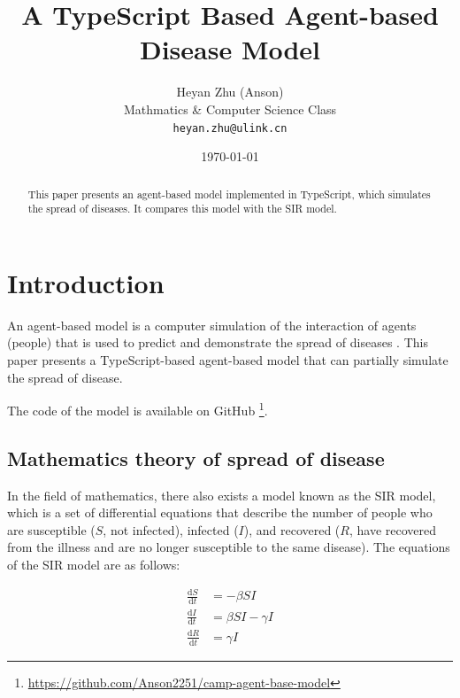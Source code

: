 \documentclass[12pt]{article}
\title{A TypeScript Based Agent-based Disease Model}
\author{Heyan Zhu (Anson)\\
\footnotesize Mathmatics \& Computer Science Class\\
\footnotesize \texttt{heyan.zhu@ulink.cn}}
\date{\today}
\begin{document}
\maketitle

\begin{abstract}
This paper presents an agent-based model implemented in TypeScript, which simulates the spread of diseases. It compares this model with the SIR model.
\end{abstract}

\newcommand{\md}{\mathrm{d}}

\section{Introduction}
An agent-based model is a computer simulation of the interaction of agents (people) that is used to predict and demonstrate the spread of diseases \cite{columbiaGeneral}. This paper presents a TypeScript-based agent-based model that can partially simulate the spread of disease.

The code of the model is available on GitHub \footnote{\url{https://github.com/Anson2251/camp-agent-base-model}}.

\subsection{Mathematics theory of spread of disease}
In the field of mathematics, there also exists a model known as the SIR model, which is a set of differential equations that describe the number of people who are susceptible ($S$, not infected), infected ($I$), and recovered ($R$, have recovered from the illness and are no longer susceptible to the same disease). The equations of the SIR model are as follows:

\begin{align}
    \frac{\md S}{\md t}&=-\beta S I\\
    \frac{\md I}{\md t}&=\beta S I-\gamma I\\
    \frac{\md R}{\md t}&=\gamma I
\end{align}
\end{document}
